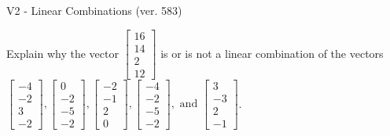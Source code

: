 \begin{exercise}
  \begin{exerciseTitle}V2 - Linear Combinations (ver. 583)\end{exerciseTitle}
  \begin{exerciseStatement}
    Explain why the vector \(\left[\begin{array}{c}
16 \\
14 \\
2 \\
12
\end{array}\right]\)  is or is not a linear 
	combination of the vectors \(\left[\begin{array}{c}
-4 \\
-2 \\
3 \\
-2
\end{array}\right] , \left[\begin{array}{c}
0 \\
-2 \\
-5 \\
-2
\end{array}\right] , \left[\begin{array}{c}
-2 \\
-1 \\
2 \\
0
\end{array}\right] , \left[\begin{array}{c}
-4 \\
-2 \\
-5 \\
-2
\end{array}\right] , \text{ and } \left[\begin{array}{c}
3 \\
-3 \\
2 \\
-1
\end{array}\right]\).
	



\end{exerciseStatement}
\end{exercise}
